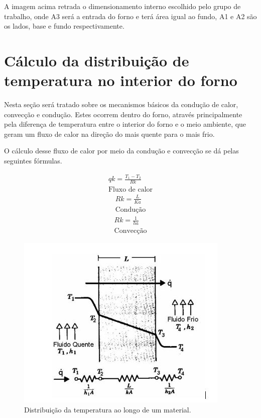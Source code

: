 A imagem acima retrada o dimensionamento interno escolhido pelo grupo de trabalho, onde A3 será a entrada do forno e terá área igual ao fundo, A1 e A2 são os lados, base e fundo respectivamente.

\section{Cálculo da distribuição de temperatura no interior do forno}

Nesta seção será tratado sobre os mecanismos básicos da condução de calor, convecção e condução. Estes ocorrem dentro do forno, através principalmente pela diferença de temperatura entre o interior do forno e o meio ambiente, que geram um fluxo de calor na direção do mais quente para o mais frio.

O cálculo desse fluxo de calor por meio da condução e convecção se dá pelas seguintes fórmulas.

\begin{align}
	qk = \frac{T_1 - T_2}{Rk} \\
    \text{Fluxo de calor}
    \nonumber
\end{align}
\begin{align}
	Rk = \frac{L}{Ka} \\
    \text{Condução}
    \nonumber
\end{align}
\begin{align}
	Rk = \frac{1}{ha} \\
    \text{Convecção}
    \nonumber
\end{align}

\begin{figure}[!ht]
	\centering
	\label{dist_temperatura}
	\includegraphics[keepaspectratio=true,scale=1.0]{figuras/dist_temperatura.JPG}
	\caption{Distribuição da temperatura ao longo de um material.}
\end{figure}

